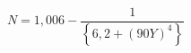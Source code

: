 \documentclass[12pt]{article}
\begin{document}
\begin{displaymath}
N = 1,006 - \frac {1} {\left\{ 6,2 + \left(90Y \right)^4 \right\} }
\end{displaymath}
\end{document}
